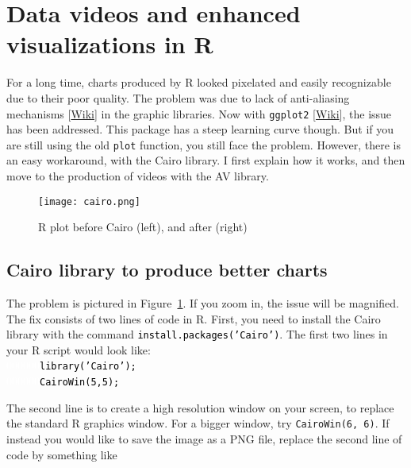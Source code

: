 \documentclass[oneside,10pt]{book}
\begin{document}


\section{Data videos and enhanced visualizations in R}\label{rprogravcx}

For a long time, charts produced by R looked pixelated and easily recognizable due to their poor quality. The problem was due
 to lack of \textcolor{index}{anti-aliasing} mechanisms [\href{https://en.wikipedia.org/wiki/Spatial_anti-aliasing}{Wiki}] in the graphic libraries. Now with \texttt{ggplot2} [\href{https://ggplot2.tidyverse.org/}{Wiki}], the issue has been addressed. This package has a steep learning curve though. But if you are still using the old \texttt{plot} function,  you still face the problem. However, there is an easy workaround, with the Cairo library. I first explain how it works, and then move to the production of videos with the AV library.

\begin{figure}[H]
\centering
\texttt{[image: cairo.png]} %
\caption{R plot before Cairo (left), and after (right)}
\label{fig:cairox}
\end{figure}

\subsection{Cairo library to produce better charts}\label{secvcare}

The problem is pictured in Figure~\ref{fig:cairox}. If you zoom in, the issue will be magnified. The fix consists of two lines of code in R. First, you need to install the Cairo library with the command \texttt{\textcolor{black}{install.packages('Cairo')}}. The first two lines in your R script would look like: \\

\noindent \textcolor{white}{000000}\texttt{\textcolor{black}{library('Cairo');}} \\
\textcolor{white}{000000}\texttt{\textcolor{black}{CairoWin(5,5);}}

\noindent The second line is to create a high resolution window on your screen, to replace the standard R graphics window. For a bigger window, try \texttt{CairoWin(6, 6)}. If instead you would like to save the image as a PNG file, replace the second line of code by something like \\
\end{document}
